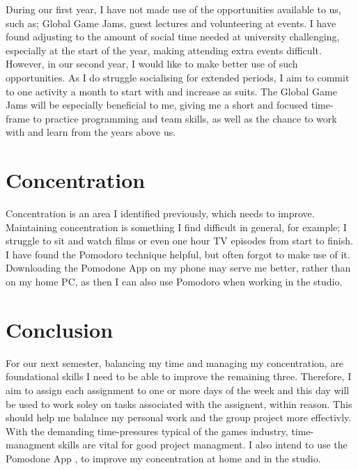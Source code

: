 \documentclass{scrartcl}
\begin{document}
During our first year, I have not made use of the opportunities available to us, such as; Global Game Jams, guest lectures and volunteering at events. I have found adjusting to the amount of social time needed at university challenging, especially at the start of the year, making attending extra events difficult. However, in our second year, I would like to make better use of such opportunities. As I do struggle socialising for extended periods, I aim to commit to one activity a month to start with and increase as suits. The Global Game Jams will be especially beneficial to me, giving me a short and focused time-frame to practice programming and team skills, as well as the chance to work with and learn from the years above us.

\section{Concentration}

Concentration is an area I identified previously, which needs to improve. Maintaining concentration is something I find difficult in general, for example; I struggle to sit and watch films or even one hour TV episodes from start to finish. I have found the Pomodoro \cite{3} technique helpful, but often forgot to make use of it. Downloading the Pomodone App \cite{2} on my phone may serve me better, rather than on my home PC, as then I can also use Pomodoro when working in the studio.  

\section{Conclusion}

For our next semester, balancing my time and managing my concentration, are foundational skills I need to be able to improve the remaining three. Therefore, I aim to assign each assignment to one or more days of the week and this day will be used to work soley on tasks associated with the assignent, within reason. This should help me balalnce my personal work and the group project more effectivly. With the demanding time-pressures typical of the games industry, time-managment skills are vital for good project managment. I also intend to use the Pomodone App \cite{2}, to improve my concentration at home and in the studio. 




\end{document}
